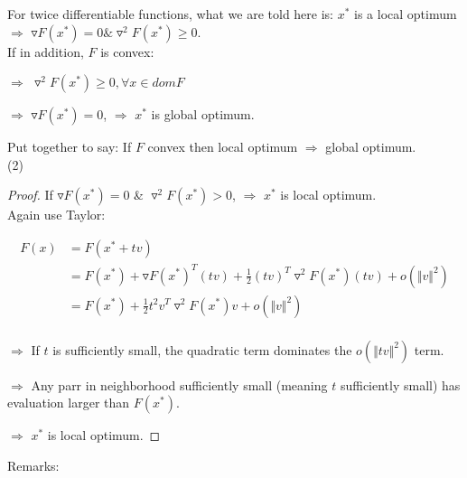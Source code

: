 For twice differentiable functions, what we are told here is: $x^*$ is a local optimum $\Rightarrow$ $\triangledown F(x^*) = 0 \& \triangledown^2F(x^*)\geq 0$.\\

If in addition, $F$ is convex:

$\Rightarrow$ $\triangledown^2F(x^*)\geq0, \forall x\in domF$

$\Rightarrow$ $\triangledown F(x^*) = 0$, $\Rightarrow$ $x^*$ is global optimum.

Put together to say: If $F$ convex then local optimum $\Rightarrow$ global optimum.\\

(2)
\begin{proof}
	If $\triangledown F(x^*) = 0$ \& $\triangledown^2 F(x^*) > 0$, $\Rightarrow$ $x^*$ is local optimum.\\
	
	Again use Taylor: 
	
	\begin{align*}
	F(x) &= F(x^* + tv) \\
	&= F(x^*) + \triangledown F(x^*)^T(tv) + \frac{1}{2}(tv)^T\triangledown^2F(x^*)(tv) + o(\Vert v \Vert^2)\\
	&= F(x^*) + \frac{1}{2}t^2v^T\triangledown^2F(x^*)v + o(\Vert v \Vert^2)\\
	\end{align*}
	
	$\Rightarrow$ If $t$ is sufficiently small, the quadratic term dominates the $o(\Vert tv \Vert^2)$ term.
	
	$\Rightarrow$ Any parr in neighborhood sufficiently small (meaning $t$ sufficiently small) has evaluation larger than $F(x^*)$.
	
	$\Rightarrow$ $x^*$ is local optimum. 
\end{proof}


Remarks: 

